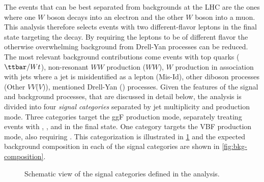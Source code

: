 The \HWW events that can be best separated from backgrounds at the LHC are the ones where one $W$ boson decays into an electron and the other $W$ boson into a muon.
This analysis therefore selects events with two different-flavor leptons in the final state targeting the \HWWdet decay.
By requiring the leptons to be of different flavor the otherwise overwhelming background from Drell-Yan processes can be reduced. 
The most relevant background contributions come events with top quarks ($\ttbar/Wt$), non-resonant $WW$ production ($WW$), $W$ production in association with jets where a jet is misidentified as a lepton (Mis-Id), other diboson processes (Other $VV$($V$)), mentioned Drell-Yan (\Zgamma) processes. 
Given the features of the signal and background processes, that are discussed in detail below, the analysis is divided into four \emph{signal categories} separated by jet multiplicity and production mode.
Three categories target the ggF production mode, separately treating events with \ZeroJet, \OneJet, and \TwoJet in the final state. One category targets the VBF production mode, also requiring \TwoJet. 
This categorization is illustrated in \cref{fig:signal-categorization} and the expected background composition in each of the signal categories are shown in \cref{fig:bkg-composition}.
\begin{figure}
    \caption{Schematic view of the signal categories defined in the \HWW analysis.}
    \label{fig:signal-categorization}
\end{figure}
